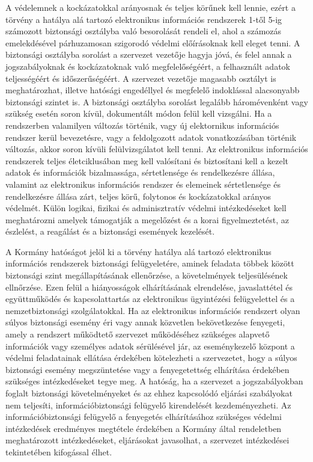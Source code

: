A védelemnek a kockázatokkal arányosnak és teljes körűnek kell lennie, ezért a törvény a hatálya alá tartozó elektronikus információs rendszerek 1-től 5-ig számozott biztonsági osztályba való besorolását rendeli el, ahol a számozás emelekdésével párhuzamosan szigorodó védelmi előírásoknak kell eleget tenni. A biztonsági osztályba sorolást a szervezet vezetője hagyja jóvá, és felel annak a jogszabályoknak és kockázatoknak való megfelelőségéért, a felhasznált adatok teljességéért és időszerűségéért. A szervezet vezetője magasabb osztályt is meghatározhat, illetve hatósági engedéllyel és megfelelő indoklással alacsonyabb biztonsági szintet is. A biztonsági osztályba sorolást legalább háromévenként vagy szükség esetén soron kívül, dokumentált módon felül kell vizsgálni. Ha a rendszerben valamilyen változás történik, vagy új elektornikus információs rendszer kerül bevezetésre, vagy a feldolgozott adatok vonatkozásában történik változás, akkor soron kívüli felülvizsgálatot kell tenni. Az elektronikus információs rendszerek teljes életciklusában meg kell valósítani és biztosítani kell a kezelt adatok és információk bizalmassága, sértetlensége és rendelkezésre állása, valamint az elektronikus információs rendszer és elemeinek sértetlensége és rendelkezésre állása zárt, teljes körű, folytonos és kockázatokkal arányos védelmét. Külön logikai, fizikai és adminisztratív védelmi intézkedéseket kell meghatározni amelyek támogatják a megelőzést és a korai figyelmeztetést, az észlelést, a reagálást és a biztonsági események kezelését.

A Kormány hatóságot jelöl ki a törvény hatálya alá tartozó elektronikus információs rendszerek biztonsági felügyeletére, aminek feladata többek között biztonsági szint megállapításának ellenőrzése, a követelmények teljesülésének ellnőrzése. Ezen felül a hiányosságok elhárításának elrendelése, javaslattétel és együttműködés és kapcsolattartás az elektronikus ügyintézési felügyelettel és a nemzetbiztonsági szolgálatokkal. Ha az elektronikus információs rendszert olyan súlyos biztonsági esemény éri vagy annak közvetlen bekövetkezése fenyegeti, amely a rendszert működtető szervezet működéséhez szükséges alapvető információk vagy személyes adatok sérülésével jár, az eseménykezelő központ a védelmi feladatainak ellátása érdekében kötelezheti a szervezetet, hogy a súlyos biztonsági esemény megszüntetése vagy a fenyegetettség elhárítása érdekében szükséges intézkedéseket tegye meg. A hatóság, ha a szervezet a jogszabályokban foglalt biztonsági követelményeket és az ehhez kapcsolódó eljárási szabályokat nem teljesíti, információbiztonsági felügyelő kirendelését kezdeményezheti. Az információbiztonsági felügyelő a fenyegetés elhárításához szükséges védelmi intézkedések eredményes megtétele érdekében a Kormány által rendeletben meghatározott intézkedéseket, eljárásokat javasolhat, a szervezet intézkedései tekintetében kifogással élhet.

